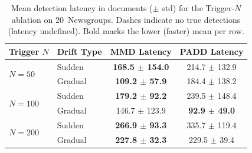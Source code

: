 \begin{table}[htbp]
  \centering
  \caption{Mean detection latency in documents ($\pm$ std) for the
           Trigger-$N$ ablation on 20~Newsgroups.
           Dashes indicate no true detections (latency undefined).
           Bold marks the lower (faster) mean per row.}
  \label{tab:ablation_latency}
  \begin{tabular}{llcc}
    \toprule
    \textbf{Trigger $N$} & \textbf{Drift Type}
      & \textbf{MMD Latency} & \textbf{PADD Latency} \\
    \midrule
    \multirow{2}{*}{$N=50$} & Sudden & \textbf{168.5 $\pm$ 154.0} & 214.7 $\pm$ 132.9 \\
     & Gradual & \textbf{109.2 $\pm$ 57.9} & 184.4 $\pm$ 138.2 \\
    \midrule
    \multirow{2}{*}{$N=100$} & Sudden & \textbf{179.2 $\pm$ 92.2} & 239.5 $\pm$ 148.4 \\
     & Gradual & 146.7 $\pm$ 123.9 & \textbf{92.9 $\pm$ 49.0} \\
    \midrule
    \multirow{2}{*}{$N=200$} & Sudden & \textbf{266.9 $\pm$ 93.3} & 335.7 $\pm$ 119.4 \\
     & Gradual & \textbf{227.8 $\pm$ 32.3} & 229.5 $\pm$ 39.4 \\
    \bottomrule
  \end{tabular}
\end{table}
